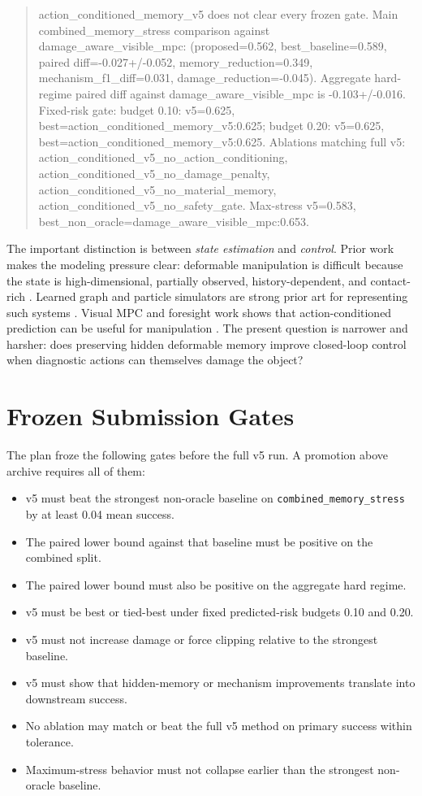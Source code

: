 \documentclass{article}
\begin{document}
\begin{quote}\small
action\_conditioned\_memory\_v5 does not clear every frozen gate. Main combined\_memory\_stress comparison against damage\_aware\_visible\_mpc: (proposed=0.562, best\_baseline=0.589, paired diff=-0.027+/-0.052, memory\_reduction=0.349, mechanism\_f1\_diff=0.031, damage\_reduction=-0.045). Aggregate hard-regime paired diff against damage\_aware\_visible\_mpc is -0.103+/-0.016. Fixed-risk gate: budget 0.10: v5=0.625, best=action\_conditioned\_memory\_v5:0.625; budget 0.20: v5=0.625, best=action\_conditioned\_memory\_v5:0.625. Ablations matching full v5: action\_conditioned\_v5\_no\_action\_conditioning, action\_conditioned\_v5\_no\_damage\_penalty, action\_conditioned\_v5\_no\_material\_memory, action\_conditioned\_v5\_no\_safety\_gate. Max-stress v5=0.583, best\_non\_oracle=damage\_aware\_visible\_mpc:0.653.
\end{quote}

The important distinction is between \emph{state estimation} and \emph{control}. Prior work makes the modeling pressure clear: deformable manipulation is difficult because the state is high-dimensional, partially observed, history-dependent, and contact-rich \citep{gu2023survey,muller2007pbd}. Learned graph and particle simulators are strong prior art for representing such systems \citep{sanchez2020gns,li2019dpi,shi2022robocraft}. Visual MPC and foresight work shows that action-conditioned prediction can be useful for manipulation \citep{finn2017deepforesight,ebert2018visualforesight,hoque2020vsf}. The present question is narrower and harsher: does preserving hidden deformable memory improve closed-loop control when diagnostic actions can themselves damage the object?

\section{Frozen Submission Gates}
The plan froze the following gates before the full v5 run. A promotion above archive requires all of them:
\begin{itemize}
\item v5 must beat the strongest non-oracle baseline on \texttt{combined\_memory\_stress} by at least 0.04 mean success.
\item The paired lower bound against that baseline must be positive on the combined split.
\item The paired lower bound must also be positive on the aggregate hard regime.
\item v5 must be best or tied-best under fixed predicted-risk budgets 0.10 and 0.20.
\item v5 must not increase damage or force clipping relative to the strongest baseline.
\item v5 must show that hidden-memory or mechanism improvements translate into downstream success.
\item No ablation may match or beat the full v5 method on primary success within tolerance.
\item Maximum-stress behavior must not collapse earlier than the strongest non-oracle baseline.
\end{itemize}
\end{document}
